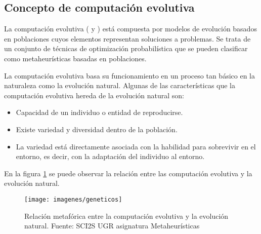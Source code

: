 \subsection{Concepto de computación evolutiva} \label{conceptevo}
La computación evolutiva (\cite{evolution} y \cite{evolution2}) está compuesta por modelos de evolución basados en poblaciones cuyos elementos representan soluciones a problemas. Se trata de un conjunto de técnicas de optimización probabilística que se pueden clasificar como metaheurísticas basadas en poblaciones.

La computación evolutiva basa su funcionamiento en un proceso tan básico en la naturaleza como la evolución natural. Algunas de las características que la computación evolutiva hereda de la evolución natural son:
\begin{itemize}
	\item Capacidad de un individuo o entidad de reproducirse.
	\item Existe variedad y diversidad dentro de la población.
	\item La variedad está directamente asociada con la habilidad para sobrevivir en el entorno, es decir, con la adaptación del individuo al entorno.
\end{itemize}

En la figura \ref{geneticos} se puede observar la relación entre las computación evolutiva y la evolución natural.

\newpage

\begin{figure} [H]
	\centering
	\texttt{[image: imagenes/geneticos]}
	\caption{Relación metafórica entre la computación evolutiva y la evolución natural. Fuente: SCI2S UGR asignatura Metaheurísticas}
	\label{geneticos}
\end{figure}

